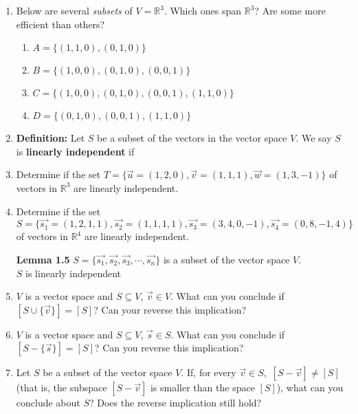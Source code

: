 \documentclass[11pt,fleqn]{article}
\begin{document}
\renewcommand{\headrulewidth}{0pt}
\newcommand{\blank}[1]{\rule{#1}{0.75pt}}
\renewcommand{\d}{\displaystyle}

\vspace*{-0.7in}

\begin{center}
  \large {}
\end{center}
\begin{enumerate}
\item Below are several \emph{subsets} of $V=\mathbb{R}^3.$ Which ones span $\mathbb{R}^3$? Are some more efficient than others?
	
	\begin{enumerate}
	\item $A=\{(1,1,0),(0,1,0) \}$
	\vfill
	\item $B=\{(1,0,0),(0,1,0),(0,0,1) \}$
	\vfill
	\item $C=\{(1,0,0),(0,1,0),(0,0,1),(1,1,0) \}$
	\vfill
	\item $D=\{(0,1,0),(0,0,1),(1,1,0) \}$
	\vfill
	\end{enumerate}
\item \textbf{Definition:} Let $S$ be a subset of the vectors in the vector space $V.$ We say $S$ is \textbf{linearly independent} if
\vspace{1.5in}
\item Determine if the set $T=\{\vec{u}=(1,2,0),\vec{v}=(1,1,1),\vec{w}=(1,3,-1)\}$ of vectors in $\mathbb{R}^3$ are linearly independent.
\vspace{2in}
\newpage
\item Determine if the set $S=\{\vec{s_1}=(1,2,1,1),\vec{s_2}=(1,1,1,1),\vec{s_3}=(3,4,0,-1),\vec{s_4}=(0,8,-1,4) \}$ of vectors in $\mathbb{R}^4$ are linearly independent.
\vspace{2in}

\textbf{Lemma 1.5} $S=\{\vec{s_1},\vec{s_2},\vec{s_3},\cdots,\vec{s_n}\}$ is a subset of the vector space $V.$\\

$S$ is linearly independent \\

\vfill

\item $V$ is a vector space and $S \subseteq V$, $\vec{v} \in V.$ What can you conclude if $[S\cup\{\vec{v}\}]=[S]$? Can your reverse this implication?
\vfill
\item $V$ is a vector space and $S \subseteq V$, $\vec{s} \in S.$ What can you conclude if $[S-\{\vec{s}\}]=[S]$? Can you reverse this implication?
\vfill
\item Let $S$ be a subset of the vector space $V.$ If, for every $\vec{v} \in {S},$ $[S-\vec{v}] \not=[S]$ (that is, the subspace $[S-\vec{v}]$ is smaller than the space $[S]$), what can you conclude about $S$? Does the reverse implication still hold? 
\vfill

 \end{enumerate}
\end{document}
